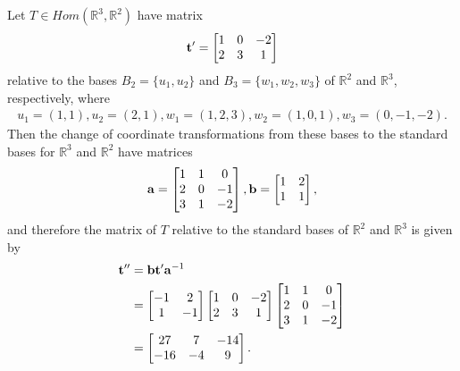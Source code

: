 \documentclass[12pt,letterpaper,reqno]{article}
\numberwithin{equation}{section}
\begin{document}
\begin{example}
	Let $T \in Hom(\mathbb{R}^3,\mathbb{R}^2)$ have matrix 
		\begin{align*}
		{\bf t}'=\begin{bmatrix}
			1&0&-2 \\
			2&3&1 \\
		\end{bmatrix}
	\end{align*}	
	relative to the bases $B_2=\{u_1, u_2\}$ and $B_3=\{w_1,w_2,w_3\}$ of $\mathbb{R}^2$ and $\mathbb{R}^3$, respectively, where
\begin{align*}
	u_1=(1,1), u_2=(2,1), w_1=(1,2,3), w_2=(1,0,1), w_3=(0,-1,-2).
\end{align*}
Then the change of coordinate transformations from these bases to the standard bases for $\mathbb{R}^3$ and $\mathbb{R}^2$ have matrices
\begin{align*}
	 {\bf a}=\begin{bmatrix}
		1 & 1 & 0 \\ 2 & 0 & -1 \\ 3 & 1 & -2
	\end{bmatrix}, {\bf b}=\begin{bmatrix}
		1 & 2 \\ 1 & 1
	\end{bmatrix},
\end{align*}
and therefore the matrix of $T$ relative to the standard bases of $\mathbb{R}^2$ and $\mathbb{R}^3$ is given by
\begin{align*}
	{\bf t}''&={\bf b}{\bf t}' {\bf a}^{-1} \\
	&=\begin{bmatrix}
			-1 & 2 \\ 1 & -1
		\end{bmatrix}\begin{bmatrix}
			1&0&-2 \\
			2&3&1 \\
		\end{bmatrix} \begin{bmatrix}
		1 & 1 & 0 \\ 2 & 0 & -1 \\ 3 & 1 & -2
	\end{bmatrix} \\
		&=\begin{bmatrix}
			27 & 7 & -14 \\ -16 & -4 & 9
		\end{bmatrix}.
\end{align*}
\end{example}
\end{document}

